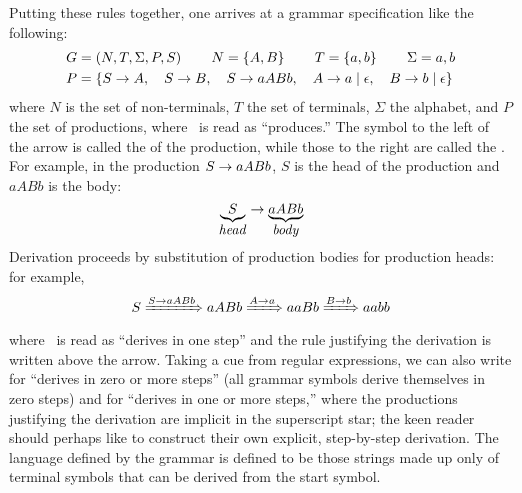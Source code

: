 Putting these rules together, one arrives at a grammar specification like the following:
\begin{equation*}
\begin{split}
&G = \left(N, T, \Sigma, P, S\right) \qquad N = \left\{ A, B \right\} \qquad T = \left\{ a, b \right\} \qquad \Sigma = {a, b}\\
&P = \{S \rightarrow A, \quad S \rightarrow B, \quad S \rightarrow aABb, \quad
    A \rightarrow a \mid \epsilon, \quad B \rightarrow b \mid \epsilon\}
\end{split}
\end{equation*}
where $N$ is the set of non-terminals, $T$ the set of terminals, $\Sigma$ the alphabet, and $P$ the set of productions, where \produces\ is read as ``produces.'' %
The symbol to the left of the arrow is called the  of the production, while those to the right are called the . For example, in the production $S \rightarrow aABb$, $S$ is the head of the production and $aABb$ is the body:
\[
\underset{\text{\normalsize\textit{head}}}{\underbrace{S}} \rightarrow \underset{\text{\normalsize\textit{body}}}{\underbrace{aABb}}
\]
Derivation proceeds by substitution of production bodies for production heads: for example,
\begin{equation}\label{syntax:deriv}
S \derives[S \produces aABb] aABb \derives[A \produces a] aaBb \derives[B \produces b] aabb
\end{equation}
where \derives\ is read as ``derives in one step'' and the rule justifying the derivation is written above the arrow. Taking a cue from regular expressions, we can also write \derives[\star] for ``derives in zero or more steps'' (all grammar symbols derive themselves in zero steps) and \derives[+] for ``derives in one or more steps,'' where the productions justifying the derivation are implicit in the superscript star; the keen reader should perhaps like to construct their own explicit, step-by-step derivation. The language defined by the grammar is defined to be those strings made up only of terminal symbols that can be derived from the start symbol.

